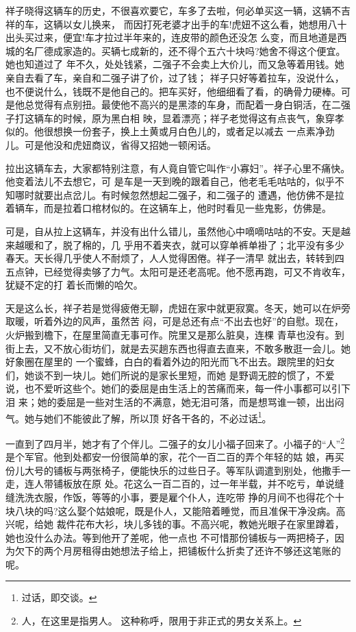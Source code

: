 \documentclass[11pt,a4paper,onecolumn]{article}
\begin{document}
祥子晓得这辆车的历史，不很喜欢要它，车多了去啦，何必单买这一辆，这辆不吉祥的车，这辆以女儿换来，
而因打死老婆才出手的车!虎妞不这么看，她想用八十出头买过来，便宜!车才拉过半年来的，连皮带的颜色还没怎
么变，而且地道是西城的名厂德成家造的。买辆七成新的，还不得个五六十块吗?她舍不得这个便宜。她也知道过了
年不久，处处钱紧，二强子不会卖上大价儿，而又急等着用钱。她亲自去看了车，亲自和二强子讲了价，过了钱；
祥子只好等着拉车，没说什么，也不便说什么，钱既不是他自己的。把车买好，他细细看了看，的确骨力硬棒。可
是他总觉得有点别扭。最使他不高兴的是黑漆的车身，而配着一身白铜活，在二强子打这辆车的时候，原为黑白相
映，显着漂亮；祥子老觉得这有点丧气，象穿孝似的。他很想换一份套子，换上土黄或月白色儿的，或者足以减去
一点素净劲儿。可是他没和虎妞商议，省得又招她一顿闲话。

拉出这辆车去，大家都特别注意，有人竟自管它叫作``小寡妇''。祥子心里不痛快。他变着法儿不去想它，可
是车是一天到晚的跟着自己，他老毛毛咕咕的，似乎不知哪时就要出点岔儿。有时候忽然想起二强子，和二强子的
遭遇，他仿佛不是拉着辆车，而是拉着口棺材似的。在这辆车上，他时时看见一些鬼影，仿佛是。

可是，自从拉上这辆车，并没有出什么错儿，虽然他心中嘀嘀咕咕的不安。天是越来越暖和了，脱了棉的，几
乎用不着夹衣，就可以穿单裤单褂了；北平没有多少春天。天长得几乎使人不耐烦了，人人觉得困倦。祥子一清早
就出去，转转到四五点钟，已经觉得卖够了力气。太阳可是还老高呢。他不愿再跑，可又不肯收车，犹疑不定的打
着长而懒的哈欠。

天是这么长，祥子若是觉得疲倦无聊，虎妞在家中就更寂寞。冬天，她可以在炉旁取暖，听着外边的风声，虽然苦
闷，可是总还有点``不出去也好''的自慰。现在，火炉搬到檐下，在屋里简直无事可作。院里又是那么脏臭，连棵
青草也没有。到街上去，又不放心街坊们，就是去买趟东西也得直去直来，不敢多散逛一会儿。她好象圈在屋里的
一个蜜蜂，白白的看着外边的阳光而飞不出去。跟院里的妇女们，她谈不到一块儿。她们所说的是家长里短，而她
是野调无腔的惯了，不爱说，也不爱听这些个。她们的委屈是由生活上的苦痛而来，每一件小事都可以引下泪
来；她的委屈是一些对生活的不满意，她无泪可落，而是想骂谁一顿，出出闷气。她与她们不能彼此了解，所以顶
好各干各的，不必过话\footnote{过话，即交谈。}。

一直到了四月半，她才有了个伴儿。二强子的女儿小福子回来了。小福子的``人''\footnote{人，在这里是指男人。
  这种称呼，限用于非正式的男女关系上。}是个军官。他到处都安一份很简单的家，花个一百二百的弄个年轻的姑
娘，再买份儿大号的铺板与两张椅子，便能快乐的过些日子。等军队调遣到别处，他撒手一走，连人带铺板放在原
处。花这么一百二百的，过一年半载，并不吃亏，单说缝缝洗洗衣服，作饭，等等的小事，要是雇个仆人，连吃带
挣的月间不也得花个十块八块的吗?这么娶个姑娘呢，既是仆人，又能陪着睡觉，而且准保干净没病。高兴呢，给她
裁件花布大衫，块儿多钱的事。不高兴呢，教她光眼子在家里蹲着，她也没什么办法。等到他开了差呢，他一点也
不可惜那份铺板与一两把椅子，因为欠下的两个月房租得由她想法子给上，把铺板什么折卖了还许不够还这笔账的
呢。
\end{document}
